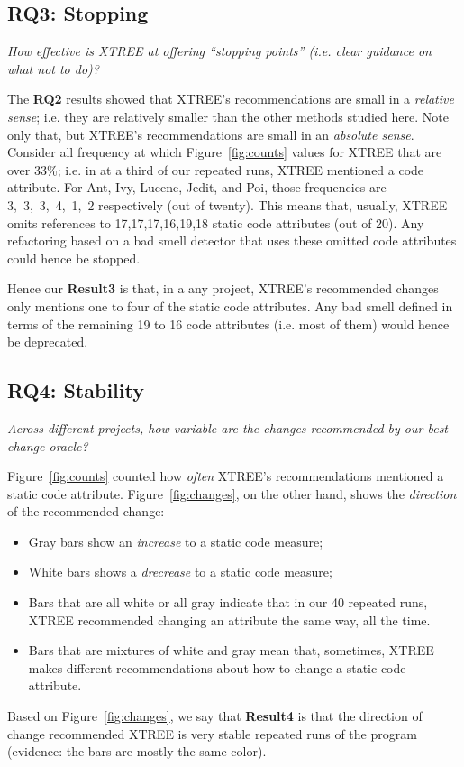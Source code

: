 \documentclass[twocolumn,5p]{elsarticle}
\newcommand{\bi}{\begin{itemize}[leftmargin=0.4cm]}
\newcommand{\ei}{\end{itemize}}
\newcommand{\fig}[1]{Figure~\ref{fig:#1}}
\theoremstyle{break}
\begin{document}
\begin{itemize}
\subsection{RQ3: Stopping}

{\em  How effective is XTREE at offering   ``stopping points'' (i.e. clear guidance on what not to do)?}

The {\bf RQ2} results showed that XTREE's recommendations are small in a {\em relative sense}; i.e. they are 
relatively smaller than the other methods studied here.
Note only that, but XTREE's recommendations are small in an {\em absolute sense}.
Consider all frequency at which  \fig{counts} values for XTREE that are over 33\%; i.e. in at a third of our  repeated runs, XTREE mentioned
a code attribute. For Ant, Ivy, Lucene, Jedit, and Poi, those frequencies
are  \mbox{3, 3, 3, 4, 1, 2} respectively (out of twenty). This means that, usually, XTREE omits references to \mbox{17,17,17,16,19,18} static
code attributes (out of 20). 
Any refactoring based on a bad smell detector that uses  these omitted code attributes could hence  be stopped.

Hence our {\bf Result3} is that, in a any  project,  XTREE's  recommended  changes  only  mentions one to four 
of the  static code attributes.  Any bad smell defined in terms of the remaining 19 to 16 code attributes (i.e. most of them)
would hence be deprecated.


\subsection{RQ4: Stability}

{\em Across different projects, how variable are the changes recommended by our best change oracle? }


\fig{counts} counted how {\em often} XTREE's recommendations mentioned a static code attribute.
\fig{changes}, on the other hand, shows the {\em direction} of the recommended change:
\bi
\item Gray bars show  an  {\em increase} to a static code measure;
\item White bars shows a   {\em drecrease} to a static code measure;
\item Bars that are all white or all gray indicate that in our 40 repeated runs, XTREE recommended changing an attribute the same way, all the time.
\item Bars that are mixtures of white and gray mean that, sometimes, XTREE makes different recommendations about how to change a static
code attribute.
\ei
Based on \fig{changes}, we say that {\bf Result4} is that the direction of change recommended  XTREE is  very stable repeated runs of the program  (evidence:
the bars are mostly the same color).


\end{itemize}
\end{document}
